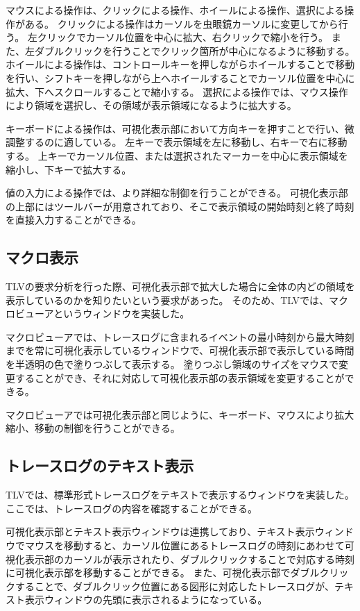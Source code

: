 マウスによる操作は、クリックによる操作、ホイールによる操作、選択による操作がある。
クリックによる操作はカーソルを虫眼鏡カーソルに変更してから行う。
左クリックでカーソル位置を中心に拡大、右クリックで縮小を行う。
また、左ダブルクリックを行うことでクリック箇所が中心になるように移動する。
ホイールによる操作は、コントロールキーを押しながらホイールすることで移動を行い、シフトキーを押しながら上へホイールすることでカーソル位置を中心に拡大、下へスクロールすることで縮小する。
選択による操作では、マウス操作により領域を選択し、その領域が表示領域になるように拡大する。

キーボードによる操作は、可視化表示部において方向キーを押すことで行い、微調整するのに適している。
左キーで表示領域を左に移動し、右キーで右に移動する。
上キーでカーソル位置、または選択されたマーカーを中心に表示領域を縮小し、下キーで拡大する。

値の入力による操作では、より詳細な制御を行うことができる。
可視化表示部の上部にはツールバーが用意されており、そこで表示領域の開始時刻と終了時刻を直接入力することができる。

\subsection{マクロ表示}

TLVの要求分析を行った際、可視化表示部で拡大した場合に全体の内どの領域を表示しているのかを知りたいという要求があった。
そのため、TLVでは、マクロビューアというウィンドウを実装した。

マクロビューアでは、トレースログに含まれるイベントの最小時刻から最大時刻までを常に可視化表示しているウィンドウで、可視化表示部で表示している時間を半透明の色で塗りつぶして表示する。
塗りつぶし領域のサイズをマウスで変更することができ、それに対応して可視化表示部の表示領域を変更することができる。

マクロビューアでは可視化表示部と同じように、キーボード、マウスにより拡大縮小、移動の制御を行うことができる。

\subsection{トレースログのテキスト表示}

TLVでは、標準形式トレースログをテキストで表示するウィンドウを実装した。
ここでは、トレースログの内容を確認することができる。

可視化表示部とテキスト表示ウィンドウは連携しており、テキスト表示ウィンドウでマウスを移動すると、カーソル位置にあるトレースログの時刻にあわせて可視化表示部のカーソルが表示されたり、ダブルクリックすることで対応する時刻に可視化表示部を移動することができる。
また、可視化表示部でダブルクリックすることで、ダブルクリック位置にある図形に対応したトレースログが、テキスト表示ウィンドウの先頭に表示されるようになっている。

